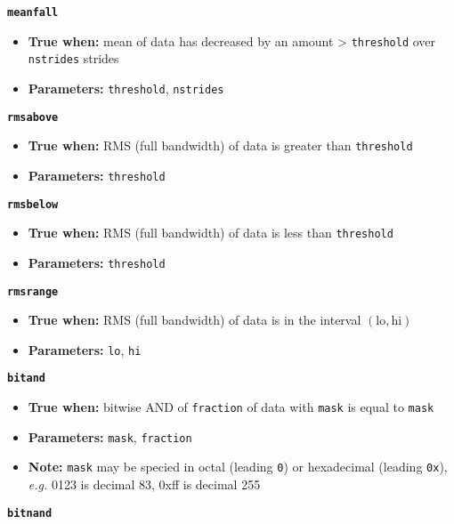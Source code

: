 {{\large\texttt{\textbf{meanfall}}}

\begin{itemize}
\item \textbf{True when:} mean of data has decreased by an amount >
  \texttt{threshold} over \texttt{nstrides} strides
\item \textbf{Parameters:} \texttt{threshold}, \texttt{nstrides}
\end{itemize}

{\large\texttt{\textbf{rmsabove}}}

\begin{itemize}
\item \textbf{True when:} RMS (full bandwidth) of data is greater than
  \texttt{threshold}
\item \textbf{Parameters:} \texttt{threshold}
\end{itemize}


{\large\texttt{\textbf{rmsbelow}}}

\begin{itemize}
\item \textbf{True when:} RMS (full bandwidth) of data is less than
  \texttt{threshold}
\item \textbf{Parameters:} \texttt{threshold}
\end{itemize}


{\large\texttt{\textbf{rmsrange}}}

\begin{itemize}
\item \textbf{True when:} RMS (full bandwidth) of data is in the interval
  $(\mathrm{lo}, \mathrm{hi})$
\item \textbf{Parameters:} \texttt{lo}, \texttt{hi}
\end{itemize}


{\large\texttt{\textbf{bitand}}}

\begin{itemize}
\item \textbf{True when:} bitwise AND of \texttt{fraction} of data
  with  \texttt{mask} is equal to \texttt{mask}
\item \textbf{Parameters:} \texttt{mask}, \texttt{fraction}
\item \textbf{Note:} \texttt{mask} may be specied in octal (leading
  \texttt{0}) or hexadecimal (leading \texttt{0x}), \textit{e.g.} 0123 is
  decimal 83, 0xff is decimal 255
\end{itemize}

{\large\texttt{\textbf{bitnand}}}

}
